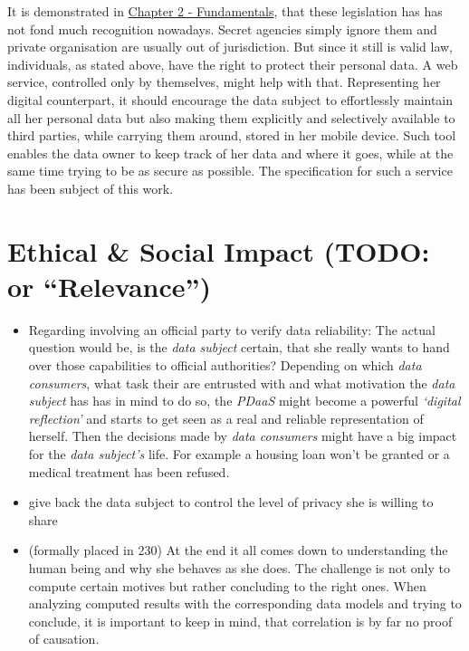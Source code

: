 \documentclass[12pt,english,a4paper,titlepage,cleardoublepage=empty,dottedtoc]{report}
\begin{document}
It is demonstrated in \protect\hyperlink{fundamentals}{Chapter 2 -
Fundamentals}, that these legislation has has not fond much recognition
nowadays. Secret agencies simply ignore them and private organisation
are usually out of jurisdiction. But since it still is valid law,
individuals, as stated above, have the right to protect their personal
data. A web service, controlled only by themselves, might help with
that. Representing her digital counterpart, it should encourage the data
subject to effortlessly maintain all her personal data but also making
them explicitly and selectively available to third parties, while
carrying them around, stored in her mobile device. Such tool enables the
data owner to keep track of her data and where it goes, while at the
same time trying to be as secure as possible. The specification for such
a service has been subject of this work.

\section{\texorpdfstring{Ethical \& Social Impact (TODO: or
``Relevance'')}{Ethical \& Social Impact (TODO: or Relevance)}}\label{ethical-social-impact-todo-or-relevance}

\begin{itemize}
\item
  Regarding involving an official party to verify data reliability: The
  actual question would be, is the \emph{data subject} certain, that she
  really wants to hand over those capabilities to official authorities?
  Depending on which \emph{data consumers}, what task their are
  entrusted with and what motivation the \emph{data subject} has has in
  mind to do so, the \emph{PDaaS} might become a powerful \emph{`digital
  reflection'} and starts to get seen as a real and reliable
  representation of herself. Then the decisions made by \emph{data
  consumers} might have a big impact for the \emph{data subject's} life.
  For example a housing loan won't be granted or a medical treatment has
  been refused.
\item
  give back the data subject to control the level of privacy she is
  willing to share
\item
  (formally placed in 230) At the end it all comes down to understanding
  the human being and why she behaves as she does. The challenge is not
  only to compute certain motives but rather concluding to the right
  ones. When analyzing computed results with the corresponding data
  models and trying to conclude, it is important to keep in mind, that
  correlation is by far no proof of causation.
\end{itemize}
\end{document}

